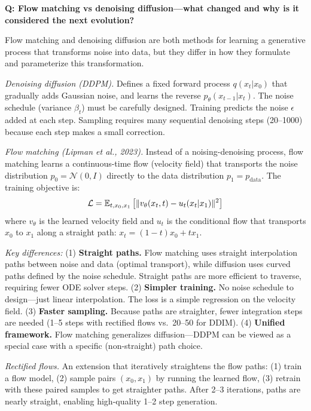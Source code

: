 \begin{interviewq}
\textbf{Q: Flow matching vs denoising diffusion---what changed and why is it considered the next evolution?}

 \quad {} \quad \badgefreq{\freqlow}

\stronganswer Flow matching and denoising diffusion are both methods for learning a generative process that transforms noise into data, but they differ in how they formulate and parameterize this transformation.

\textit{Denoising diffusion (DDPM).} Defines a fixed forward process $q(x_t | x_0)$ that gradually adds Gaussian noise, and learns the reverse $p_\theta(x_{t-1} | x_t)$. The noise schedule (variance $\beta_t$) must be carefully designed. Training predicts the noise $\epsilon$ added at each step. Sampling requires many sequential denoising steps (20--1000) because each step makes a small correction.

\textit{Flow matching (Lipman et al., 2023).} Instead of a noising-denoising process, flow matching learns a continuous-time flow (velocity field) that transports the noise distribution $p_0 = \mathcal{N}(0, I)$ directly to the data distribution $p_1 = p_{\text{data}}$. The training objective is:
$$\mathcal{L} = \operatorname{\mathbb{E}}_{t, x_0, x_1}\left[\|v_\theta(x_t, t) - u_t(x_t | x_1)\|^2\right]$$
where $v_\theta$ is the learned velocity field and $u_t$ is the conditional flow that transports $x_0$ to $x_1$ along a straight path: $x_t = (1-t)x_0 + t x_1$.

\textit{Key differences:} (1) \textbf{Straight paths.} Flow matching uses straight interpolation paths between noise and data (optimal transport), while diffusion uses curved paths defined by the noise schedule. Straight paths are more efficient to traverse, requiring fewer ODE solver steps. (2) \textbf{Simpler training.} No noise schedule to design---just linear interpolation. The loss is a simple regression on the velocity field. (3) \textbf{Faster sampling.} Because paths are straighter, fewer integration steps are needed (1--5 steps with rectified flows vs.\ 20--50 for DDIM). (4) \textbf{Unified framework.} Flow matching generalizes diffusion---DDPM can be viewed as a special case with a specific (non-straight) path choice.

\textit{Rectified flows.} An extension that iteratively straightens the flow paths: (1) train a flow model, (2) sample pairs $(x_0, x_1)$ by running the learned flow, (3) retrain with these paired samples to get straighter paths. After 2--3 iterations, paths are nearly straight, enabling high-quality 1--2 step generation.


\end{interviewq}
